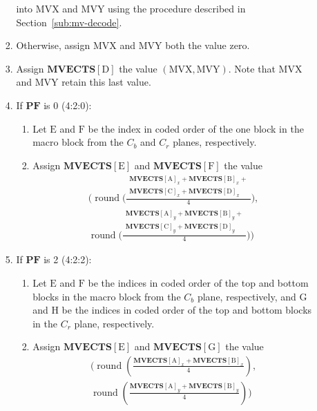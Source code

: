 \documentclass[9pt,letterpaper]{book}
\newcommand{\bitvar}[1]{\ensuremath{\mathbf{\bm{#1}}}}
\newcommand{\locvar}[1]{\ensuremath{\mathrm{#1}}}
\newcommand{\round}{\ensuremath{\mathop{\mathrm{round}}\nolimits}}
\numberwithin{equation}{chapter}
\numberwithin{figure}{chapter}
\numberwithin{table}{chapter}
\begin{document}
\begin{enumerate}
\begin{enumerate}
\begin{enumerate}
 into \locvar{MVX} and \locvar{MVY} using the procedure described in
 Section~\ref{sub:mv-decode}.
\item
Otherwise, assign \locvar{MVX} and \locvar{MVY} both the value zero.
\item
Assign $\bitvar{MVECTS}[\locvar{D}]$ the value $(\locvar{MVX},\locvar{MVY})$.
Note that \locvar{MVX} and \locvar{MVY} retain this last value.
\item
If \bitvar{PF} is 0 (4:2:0):
\begin{enumerate}
\item
Let \locvar{E} and \locvar{F} be the index in coded order of the one block in
 the macro block from the $C_b$ and $C_r$ planes, respectively.
\item
Assign $\bitvar{MVECTS}[\locvar{E}]$ and $\bitvar{MVECTS}[\locvar{F}]$ the
 value
\begin{multline*}
(\round\biggl(\frac{\begin{aligned}
 \bitvar{MVECTS}[\locvar{A}]_x+\bitvar{MVECTS}[\locvar{B}]_x+\\
 \bitvar{MVECTS}[\locvar{C}]_x+\bitvar{MVECTS}[\locvar{D}]_x
 \end{aligned}}{4}\biggr), \\
 \round\biggl(\frac{\begin{aligned}
 \bitvar{MVECTS}[\locvar{A}]_y+\bitvar{MVECTS}[\locvar{B}]_y+\\
 \bitvar{MVECTS}[\locvar{C}]_y+\bitvar{MVECTS}[\locvar{D}]_y
 \end{aligned}}{4}\biggr))
\end{multline*}
\end{enumerate}
\item
If \bitvar{PF} is 2 (4:2:2):
\begin{enumerate}
\item
Let \locvar{E} and \locvar{F} be the indices in coded order of the top and
 bottom blocks in the macro block from the $C_b$ plane, respectively, and
 \locvar{G} and \locvar{H} be the indices in coded order of the top and bottom
 blocks in the $C_r$ plane, respectively. %
\item
Assign $\bitvar{MVECTS}[\locvar{E}]$ and $\bitvar{MVECTS}[\locvar{G}]$ the
 value
\begin{multline*}
(\round\left(\frac{
 \bitvar{MVECTS}[\locvar{A}]_x+\bitvar{MVECTS}[\locvar{B}]_x}{4}\right), \\
 \round\left(\frac{
 \bitvar{MVECTS}[\locvar{A}]_y+\bitvar{MVECTS}[\locvar{B}]_y}{4}\right))
\end{multline*}

\end{enumerate}
\end{enumerate}
\end{enumerate}
\end{enumerate}
\end{document}
